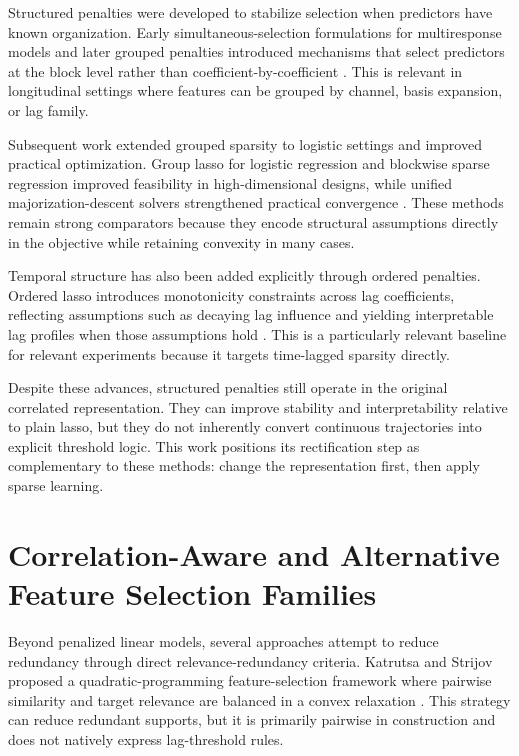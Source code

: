 Structured penalties were developed to stabilize selection when predictors have known organization. Early simultaneous-selection formulations for multiresponse models and later grouped penalties introduced mechanisms that select predictors at the block level rather than coefficient-by-coefficient \autocites{turlach2005,yuan2006}. This is relevant in longitudinal settings where features can be grouped by channel, basis expansion, or lag family.

Subsequent work extended grouped sparsity to logistic settings and improved practical optimization. Group lasso for logistic regression and blockwise sparse regression improved feasibility in high-dimensional designs, while unified majorization-descent solvers strengthened practical convergence \autocites{meier2008,kim2006,yang2015}. These methods remain strong comparators because they encode structural assumptions directly in the objective while retaining convexity in many cases.

Temporal structure has also been added explicitly through ordered penalties. Ordered lasso introduces monotonicity constraints across lag coefficients, reflecting assumptions such as decaying lag influence and yielding interpretable lag profiles when those assumptions hold \autocite{RTibshirani2016ordered}. This is a particularly relevant baseline for relevant experiments because it targets time-lagged sparsity directly.

Despite these advances, structured penalties still operate in the original correlated representation. They can improve stability and interpretability relative to plain lasso, but they do not inherently convert continuous trajectories into explicit threshold logic. This work positions its rectification step as complementary to these methods: change the representation first, then apply sparse learning.

\section[Correlation-Aware Feature Selection Families]{Correlation-Aware and Alternative Feature Selection Families}

Beyond penalized linear models, several approaches attempt to reduce redundancy through direct relevance-redundancy criteria. Katrutsa and Strijov proposed a quadratic-programming feature-selection framework where pairwise similarity and target relevance are balanced in a convex relaxation \autocite{katrutsa2017}. This strategy can reduce redundant supports, but it is primarily pairwise in construction and does not natively express lag-threshold rules.

